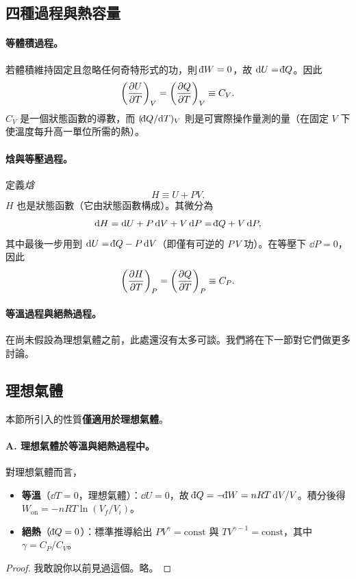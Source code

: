 \subsection{四種過程與熱容量}

\paragraph{等體積過程。}
若體積維持固定且忽略任何奇特形式的功，則 $\dbar W = 0$，故 $\dd U = \dbar Q$。因此
\[
    \left(\dfrac{\partial U}{\partial T}\right)_{V} = \left(\dfrac{\partial Q}{\partial T}\right)_{V} \equiv C_V.
\]
$C_V$ 是一個狀態函數的導數，而 $(\dbar Q/\dd T)_V$ 則是可實際操作量測的量（在固定 $V$ 下使溫度每升高一單位所需的熱）。

\paragraph{焓與等壓過程。}
定義\emph{焓}
\[
    H \equiv U + PV.
\]
$H$ 也是狀態函數（它由狀態函數構成）。其微分為
\[
    \dd H = \dd U + P\,\dd V + V\,\dd P = \dbar Q + V\,\dd P,
\]
其中最後一步用到 $\dd U = \dbar Q - P\,\dd V$（即僅有可逆的 $P\,V$ 功）。在等壓下 $\dd P = 0$，因此
\[
    \left(\dfrac{\partial H}{\partial T}\right)_{P} = \left(\dfrac{\partial Q}{\partial T}\right)_{P} \equiv C_P.
\]

\paragraph{等溫過程與絕熱過程。}
在尚未假設為理想氣體之前，此處還沒有太多可談。我們將在下一節對它們做更多討論。


\subsection{理想氣體}
本節所引入的性質\textbf{僅適用於理想氣體}。
\paragraph{A. 理想氣體於等溫與絕熱過程中。}
\begin{theorem}
    對理想氣體而言，
    \begin{itemize}
        \item \textbf{等溫}（$\dd T = 0$，理想氣體）：$\dd U = 0$，故 $\dbar Q = -\dbar W = nRT\,\dd V/V$。積分後得 $W_{\text{on}} = -nRT\ln(V_f/V_i)$。
        \item \textbf{絕熱}（$\dbar Q = 0$）：標準推導給出 $PV^\gamma = \mathrm{const}$ 與 $TV^{\gamma-1} = \mathrm{const}$，其中 $\gamma = C_P/C_V$。
    \end{itemize}
\end{theorem}
\begin{proof}
    我敢說你以前見過這個。略。
\end{proof}

